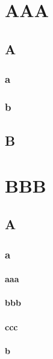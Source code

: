 

\chapter{AAA}
\section{A}

\subsection{a}

\subsection{b}


\section{B}


\chapter{BBB}
\section{A}
\subsection{a}


\subsubsection{aaa}
\subsubsection{bbb}
\subsubsection{ccc}


\subsubsection{b}

